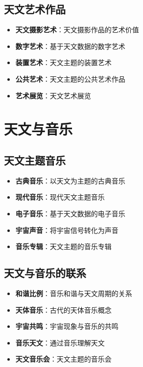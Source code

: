 \documentclass[12pt,UTF8]{ctexbook}
\begin{document}
\section{天文艺术作品}

\begin{itemize}
  \item \textbf{天文摄影艺术}：天文摄影作品的艺术价值
  \item \textbf{数字艺术}：基于天文数据的数字艺术
  \item \textbf{装置艺术}：天文主题的装置艺术
  \item \textbf{公共艺术}：天文主题的公共艺术作品
  \item \textbf{艺术展览}：天文艺术展览
\end{itemize}

\chapter{天文与音乐}
\section{天文主题音乐}

\begin{itemize}
  \item \textbf{古典音乐}：以天文为主题的古典音乐
  \item \textbf{现代音乐}：现代天文主题音乐
  \item \textbf{电子音乐}：基于天文数据的电子音乐
  \item \textbf{宇宙声音}：将宇宙信号转化为声音
  \item \textbf{音乐专辑}：天文主题的音乐专辑
\end{itemize}

\section{天文与音乐的联系}

\begin{itemize}
  \item \textbf{和谐比例}：音乐和谐与天文周期的关系
  \item \textbf{天体音乐}：古代的天体音乐概念
  \item \textbf{宇宙共鸣}：宇宙现象与音乐的共鸣
  \item \textbf{音乐天文}：通过音乐理解天文
  \item \textbf{天文音乐会}：天文主题的音乐会
\end{itemize}
\end{document}
